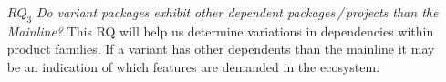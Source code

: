 \begin{itemize}


\item[\textbf{$RQ_3$}] \textit{Do variant packages exhibit other dependent packages\,/\,projects than the Mainline?}
This RQ will help us determine variations in dependencies within product families.
If a variant has other dependents than the mainline it may be an indication of which features are demanded in the ecosystem.


\end{itemize}
